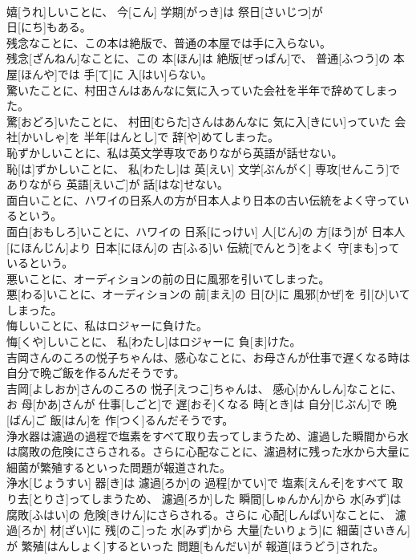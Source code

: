 \documentclass[8pt]{extreport}
\begin{document}
\begin{CJK}{UTF8}{min}
\\	嬉[うれ]しいことに、 今[こん] 学期[がっき]は 祭日[さいじつ]が 
\\	日[にち]もある。
\\	残念なことに、この本は絶版で、普通の本屋では手に入らない。	
\\	残念[ざんねん]なことに、この 本[ほん]は 絶版[ぜっぱん]で、 普通[ふつう]の 本屋[ほんや]では 手[て]に 入[はい]らない。
\\	驚いたことに、村田さんはあんなに気に入っていた会社を半年で辞めてしまった。	
\\	驚[おどろ]いたことに、 村田[むらた]さんはあんなに 気に入[きにい]っていた 会社[かいしゃ]を 半年[はんとし]で 辞[や]めてしまった。
\\	恥ずかしいことに、私は英文学専攻でありながら英語が話せない。	
\\	恥[は]ずかしいことに、 私[わたし]は 英[えい] 文学[ぶんがく] 専攻[せんこう]でありながら 英語[えいご]が 話[はな]せない。
\\	面白いことに、ハワイの日系人の方が日本人より日本の古い伝統をよく守っているという。	
\\	面白[おもしろ]いことに、ハワイの 日系[にっけい] 人[じん]の 方[ほう]が 日本人[にほんじん]より 日本[にほん]の 古[ふる]い 伝統[でんとう]をよく 守[まも]っているという。
\\	悪いことに、オーディションの前の日に風邪を引いてしまった。	
\\	悪[わる]いことに、オーディションの 前[まえ]の 日[ひ]に 風邪[かぜ]を 引[ひ]いてしまった。
\\	悔しいことに、私はロジャーに負けた。	
\\	悔[くや]しいことに、 私[わたし]はロジャーに 負[ま]けた。
\\	吉岡さんのころの悦子ちゃんは、感心なことに、お母さんが仕事で遅くなる時は自分で晩ご飯を作るんだそうです。	
\\	吉岡[よしおか]さんのころの 悦子[えつこ]ちゃんは、 感心[かんしん]なことに、お 母[かあ]さんが 仕事[しごと]で 遅[おそ]くなる 時[とき]は 自分[じぶん]で 晩[ばん]ご 飯[はん]を 作[つく]るんだそうです。
\\	浄水器は濾過の過程で塩素をすべて取り去ってしまうため、濾過した瞬間から水は腐敗の危険にさらされる。さらに心配なことに、濾過材に残った水から大量に細菌が繁殖するといった問題が報道された。	
\\	浄水[じょうすい] 器[き]は 濾過[ろか]の 過程[かてい]で 塩素[えんそ]をすべて 取り去[とりさ]ってしまうため、 濾過[ろか]した 瞬間[しゅんかん]から 水[みず]は 腐敗[ふはい]の 危険[きけん]にさらされる。さらに 心配[しんぱい]なことに、 濾過[ろか] 材[ざい]に 残[のこ]った 水[みず]から 大量[たいりょう]に 細菌[さいきん]が 繁殖[はんしょく]するといった 問題[もんだい]が 報道[ほうどう]された。

\end{CJK}
\end{document}
